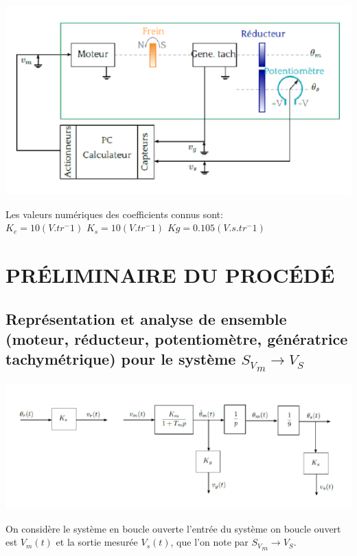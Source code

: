 \documentclass[12pt, a4paper, openany]{report}
\begin{document}
\begin{center}
\includegraphics[scale=0.5]{fiiig1.png}
\label{fig1} 
\end{center}

Les valeurs numériques des coefficients connus sont:\\

 $K_e=10(V.tr^-1)$	 \hfill		$K_s=10(V.tr^-1)$	\hfill		$Kg=0.105(V.s.tr^-1)$ 
 
 
    \chapter{ PRÉLIMINAIRE DU PROCÉDÉ}
     \section{Représentation et analyse de ensemble (moteur, réducteur, potentiomètre, génératrice        tachymétrique) pour le système $ {S_V}_m \rightarrow V_S$ }
 

\begin{center}
\includegraphics[scale=0.5]{fiiig2.png}
\label{fig1} 
\end{center}

On considère le système en boucle ouverte l’entrée du système on boucle ouvert est $V_m(t)$ et la sortie mesurée $V_s(t)$, que l’on note  par $ {S_V}_m \rightarrow V_S$.
\end{document}
